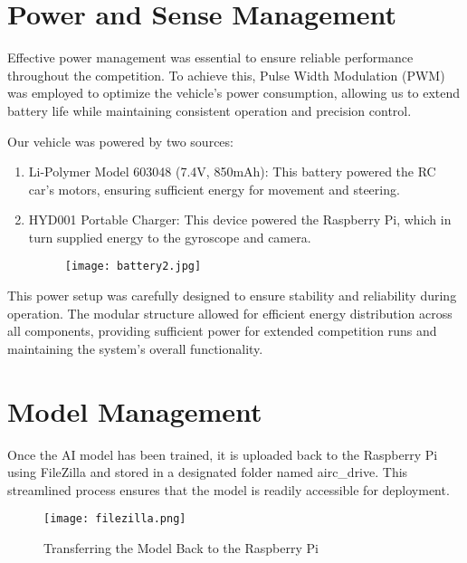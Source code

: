 \documentclass{article}
\begin{document}
\begin{multicols}{2}
\section{Power and Sense Management}

Effective power management was essential to ensure reliable performance throughout the competition. To achieve this, Pulse Width Modulation (PWM) was employed to optimize the vehicle's power consumption, allowing us to extend battery life while maintaining consistent operation and precision control.

Our vehicle was powered by two sources:

\begin{enumerate}
    \item Li-Polymer Model 603048 (7.4V, 850mAh): This battery powered the RC car's motors, ensuring sufficient energy for movement and steering.

    \item HYD001 Portable Charger: This device powered the Raspberry Pi, which in turn supplied energy to the gyroscope and camera.

    \begin{figure}[H]
    \centering         \texttt{[image: battery2.jpg]}
\end{figure}
    
\end{enumerate}

This power setup was carefully designed to ensure stability and reliability during operation. The modular structure allowed for efficient energy distribution across all components, providing sufficient power for extended competition runs and maintaining the system’s overall functionality.

\section{Model Management}
Once the AI model has been trained, it is uploaded back to the Raspberry Pi using FileZilla and stored in a designated folder named airc\_drive. This streamlined process ensures that the model is readily accessible for deployment.

\begin{figure}[H]
    \centering         \texttt{[image: filezilla.png]}
    \caption*{Transferring the Model Back to the Raspberry Pi}
\end{figure}

\newpage


\end{multicols}
\end{document}

